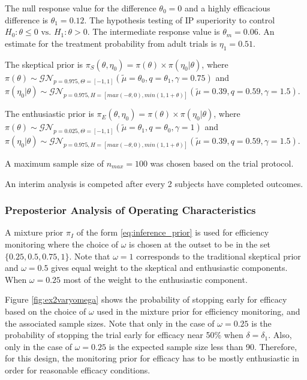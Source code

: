 \documentclass[12pt]{article}
\begin{document}
The null response value for the difference $\theta_0=0$ and a highly efficacious difference is $\theta_1=0.12$. The hypothesis testing of IP superiority to control $H_0:\theta\leq 0\text{ vs. }H_1: \theta>0$. The intermediate response value is $\theta_m=0.06$. An estimate for the treatment probability from adult trials is $\eta_1=0.51$. 

The skeptical prior is $\pi_S(\theta,\eta_0)=\pi(\theta)\times\pi(\eta_0|\theta)$, where $\pi(\theta)\sim\mathcal{GN}_{p=0.975,\Theta=[-1,1]}(\tilde{\mu}=\theta_0,q=\theta_1,\gamma=0.75)$ and $\pi(\eta_0|\theta)\sim\mathcal{GN}_{p=0.975,H=[max(-\theta,0),min(1,1+\theta)]}(\tilde{\mu}=0.39,q=0.59,\gamma=1.5)$. 

The enthusiastic prior is $\pi_E(\theta,\eta_0)=\pi(\theta)\times\pi(\eta_0|\theta)$, where $\pi(\theta)\sim\mathcal{GN}_{p=0.025,\Theta=[-1,1]}(\tilde{\mu}=\theta_1,q=\theta_0,\gamma=1)$ and $\pi(\eta_0|\theta)\sim\mathcal{GN}_{p=0.975,H=[max(-\theta,0),min(1,1+\theta)]}(\tilde{\mu}=0.39,q=0.59,\gamma=1.5)$. 

A maximum sample size of $n_{max}=100$ was chosen based on the trial protocol.

An interim analysis is competed after every 2 subjects have completed outcomes.

\subsubsection{Preposterior Analysis of Operating Characteristics}\label{sec:ex2operatingcharacteristics}
A mixture prior $\pi_I$ of the form \eqref{eq:inference_prior} is used for efficiency monitoring where the choice of $\omega$ is chosen at the outset to be in the set $\{0.25,0.5,0.75,1\}$. Note that $\omega=1$ corresponds to the traditional skeptical prior and $\omega=0.5$ gives equal weight to the skeptical and enthusiastic components. When $\omega=0.25$ most of the weight to the enthusiastic component.

Figure \ref{fig:ex2varyomega} shows the probability of stopping early for efficacy based on the choice of $\omega$ used in the mixture prior for efficiency monitoring, and the associated sample sizes. Note that only in the case of $\omega=0.25$ is the probability of stopping the trial early for efficacy near 50\% when $\delta=\delta_1$. Also, only in the case of $\omega=0.25$ is the expected sample size less than 90. Therefore, for this design, the monitoring prior for efficacy has to be mostly enthusiastic in order for reasonable efficacy conditions.
\end{document}
